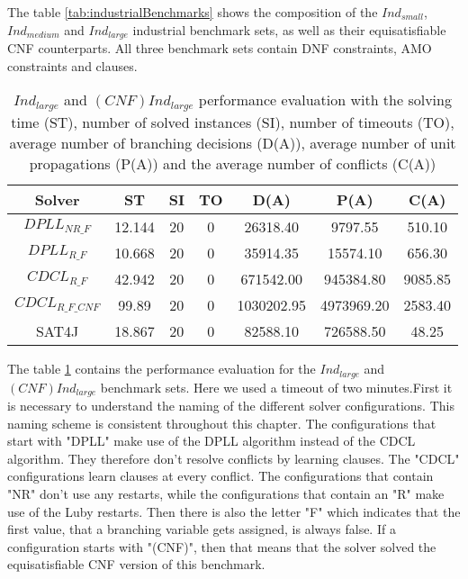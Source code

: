 The table \ref{tab:industrialBenchmarks} shows the composition of the $Ind_{small}$, $Ind_{medium}$ and $Ind_{large}$ industrial benchmark sets, as well as their equisatisfiable CNF counterparts. All three benchmark sets contain DNF constraints, AMO constraints and clauses.


\begin{table}[!htb]
\centering
\caption[$Ind_{large}$ and $(CNF)Ind_{large}$ performance evaluation]{$Ind_{large}$ and $(CNF)Ind_{large}$ performance evaluation with the solving time (ST), number of solved instances (SI), number of timeouts (TO), average number of branching decisions (D(A)), average number of unit propagations (P(A)) and the average number of conflicts (C(A))}
\label{tab:mBenchmarks}
\begin{tabular}{|c|c|c|c|c|c|c|}
\hline
Solver & ST & SI & TO & D(A) & P(A) & C(A)\\ 
\hline
$DPLL_{NR\_F}$ & 12.144 & 20 & 0 & 26318.40 & 9797.55 & 510.10 \\ 
\hline
$DPLL_{R\_F}$ & 10.668 & 20 & 0 & 35914.35 & 15574.10 & 656.30 \\ 
\hline
$CDCL_{R\_F}$ & 42.942 & 20 & 0 & 671542.00 & 945384.80 & 9085.85 \\ 
\hline
$CDCL_{R\_F\_CNF}$ & 99.89 & 20 & 0 & 1030202.95 & 4973969.20 & 2583.40 \\ 
\hline
SAT4J & 18.867 & 20 & 0 & 82588.10 & 726588.50 & 48.25 \\ 
\hline
\end{tabular}
\end{table}

The table \ref{tab:mBenchmarks} contains the performance evaluation for the $Ind_{large}$ and $(CNF)Ind_{large}$ benchmark sets. Here we used a timeout of two minutes.First it is necessary to understand the naming of the different solver configurations. This naming scheme is consistent throughout this chapter. The configurations that start with "DPLL" make use of the DPLL algorithm instead of the CDCL algorithm. They therefore don't resolve conflicts by learning clauses. The "CDCL" configurations learn clauses at every conflict. The configurations that contain "NR" don't use any restarts, while the configurations that contain an "R" make use of the Luby restarts. Then there is also the letter "F" which indicates that the first value, that a branching variable gets assigned, is always false. If a configuration starts with "(CNF)", then that means that the solver solved the equisatisfiable CNF version of this benchmark.

